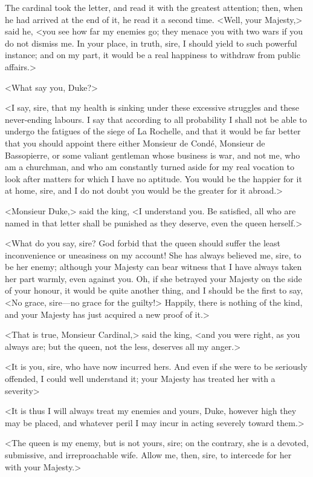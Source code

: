 The cardinal took the letter, and read it with the greatest attention; then, when he had arrived at the end of it, he read it a second time. <Well, your Majesty,> said he, <you see how far my enemies go; they menace you with two wars if you do not dismiss me. In your place, in truth, sire, I should yield to such powerful instance; and on my part, it would be a real happiness to withdraw from public affairs.> 

<What say you, Duke?> 

<I say, sire, that my health is sinking under these excessive struggles and these never-ending labours. I say that according to all probability I shall not be able to undergo the fatigues of the siege of La Rochelle, and that it would be far better that you should appoint there either Monsieur de Condé, Monsieur de Bassopierre, or some valiant gentleman whose business is war, and not me, who am a churchman, and who am constantly turned aside for my real vocation to look after matters for which I have no aptitude. You would be the happier for it at home, sire, and I do not doubt you would be the greater for it abroad.> 

<Monsieur Duke,> said the king, <I understand you. Be satisfied, all who are named in that letter shall be punished as they deserve, even the queen herself.> 

<What do you say, sire? God forbid that the queen should suffer the least inconvenience or uneasiness on my account! She has always believed me, sire, to be her enemy; although your Majesty can bear witness that I have always taken her part warmly, even against you. Oh, if she betrayed your Majesty on the side of your honour, it would be quite another thing, and I should be the first to say, <No grace, sire---no grace for the guilty!> Happily, there is nothing of the kind, and your Majesty has just acquired a new proof of it.> 

<That is true, Monsieur Cardinal,> said the king, <and you were right, as you always are; but the queen, not the less, deserves all my anger.> 

<It is you, sire, who have now incurred hers. And even if she were to be seriously offended, I could well understand it; your Majesty has treated her with a severity\longdash> 

<It is thus I will always treat my enemies and yours, Duke, however high they may be placed, and whatever peril I may incur in acting severely toward them.> 

<The queen is my enemy, but is not yours, sire; on the contrary, she is a devoted, submissive, and irreproachable wife. Allow me, then, sire, to intercede for her with your Majesty.> 

